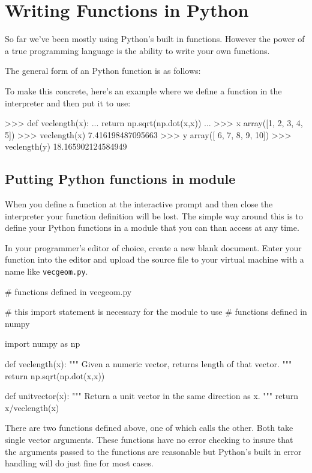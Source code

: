 
\section{Writing Functions in Python}

So far we've been mostly using Python's built in functions. However the power of a
true programming language is the ability to write your own functions.

The general form of an Python function is as follows:

\begin{python}
def funcname(arg1, arg2):
    # body of function
    return result
}
\end{python}
%
To make this concrete, here's an example where we define a function in
the interpreter and then put it to use:
%
\begin{python}
>>> def veclength(x):
...     return np.sqrt(np.dot(x,x))
...
>>> x
array([1, 2, 3, 4, 5])
>>> veclength(x)
7.416198487095663
>>> y
array([ 6,  7,  8,  9, 10])
>>> veclength(y)
18.165902124584949
\end{python}

\subsection{Putting Python functions in module}

When you define a function at the interactive prompt and then close the
interpreter your function definition will be lost. The simple way around
this is to define your Python functions in a module that you can than access
at any time.

In your programmer's editor of choice, create a new blank document. Enter your function into the editor
and upload the source file to your virtual machine with a name like
\lstinline!vecgeom.py!.

\begin{python}
# functions defined in vecgeom.py

# this import statement is necessary for the module to use
# functions defined in numpy

import numpy as np

def veclength(x):
    """ Given a numeric vector, returns length of that vector. """
    return np.sqrt(np.dot(x,x))


def unitvector(x):
    """ Return a unit vector in the same direction as x. """
    return x/veclength(x)


\end{python}
There are two functions defined above, one of which calls the other. Both take single vector arguments. These functions have no error checking to insure that the arguments passed to the functions are reasonable but Python's built in error handling will do just fine for most cases.

